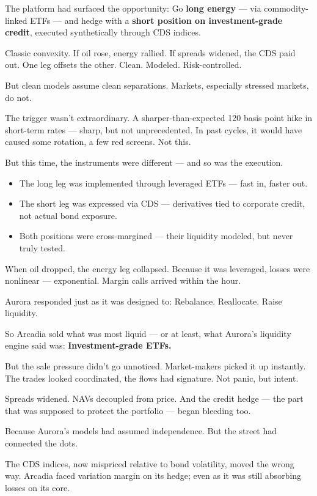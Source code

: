The platform had surfaced the opportunity:  
Go \textbf{long energy} — via commodity-linked ETFs —  
and hedge with a \textbf{short position on investment-grade credit}, executed synthetically through CDS indices.

Classic convexity.  
If oil rose, energy rallied.  
If spreads widened, the CDS paid out.  
One leg offsets the other.  
Clean. Modeled. Risk-controlled.

But clean models assume clean separations.  
Markets, especially stressed markets, do not.

The trigger wasn’t extraordinary.  
A sharper-than-expected 120 basis point hike in short-term rates — sharp, but not unprecedented.  
In past cycles, it would have caused some rotation, a few red screens. Not this.

But this time, the instruments were different — and so was the execution.

\begin{itemize}
  \item The long leg was implemented through leveraged ETFs — fast in, faster out.
  \item The short leg was expressed via CDS — derivatives tied to corporate credit, not actual bond exposure.
  \item Both positions were cross-margined — their liquidity modeled, but never truly tested.
\end{itemize}

When oil dropped, the energy leg collapsed.  
Because it was leveraged, losses were nonlinear — exponential.  
Margin calls arrived within the hour.

Aurora responded just as it was designed to:  
Rebalance. Reallocate. Raise liquidity.

So Arcadia sold what was most liquid — or at least, what Aurora’s liquidity engine said was:  
\textbf{Investment-grade ETFs.}

But the sale pressure didn’t go unnoticed.  
Market-makers picked it up instantly.  
The trades looked coordinated, the flows had signature.  
Not panic, but intent.

Spreads widened.  
NAVs decoupled from price.  
And the credit hedge — the part that was supposed to protect the portfolio — began bleeding too.

Because Aurora’s models had assumed independence.  
But the street had connected the dots.

The CDS indices, now mispriced relative to bond volatility, moved the wrong way.  
Arcadia faced variation margin on its hedge; even as it was still absorbing losses on its core.

